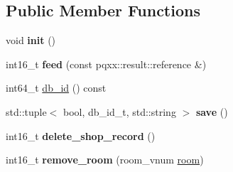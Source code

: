 \subsection*{Public Member Functions}
\begin{DoxyCompactItemize}
\item 
\mbox{\label{structmods_1_1orm_1_1shop_af6942b864fd5faa45db52fc9955ba5d9}} 
void {\bfseries init} ()
\item 
\mbox{\label{structmods_1_1orm_1_1shop_a1645fa83ebf694d5bd6a247becec5538}} 
int16\+\_\+t {\bfseries feed} (const pqxx\+::result\+::reference \&)
\item 
int64\+\_\+t \hyperlink{structmods_1_1orm_1_1shop_a696c01543bff9b376b37136834c5c285}{db\+\_\+id} () const
\item 
\mbox{\label{structmods_1_1orm_1_1shop_a0fa7c25ff8e6a40c6edfc48abcde585d}} 
std\+::tuple$<$ bool, db\+\_\+id\+\_\+t, std\+::string $>$ {\bfseries save} ()
\item 
\mbox{\label{structmods_1_1orm_1_1shop_aacd3c43225153cc554b8287cbe39477e}} 
int16\+\_\+t {\bfseries delete\+\_\+shop\+\_\+record} ()
\item 
\mbox{\label{structmods_1_1orm_1_1shop_a1f2b7f07775f3fb3a24aba853eeacb26}} 
int16\+\_\+t {\bfseries remove\+\_\+room} (room\+\_\+vnum \hyperlink{structmods_1_1orm_1_1room}{room})
\end{DoxyCompactItemize}
